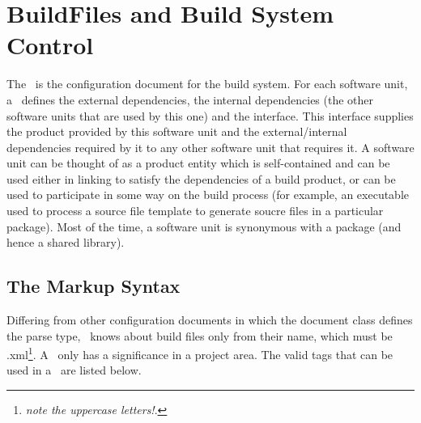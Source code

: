 \section{BuildFiles and Build System Control}

The \buildfile\ is the configuration document for the build system. For
each software unit, a \buildfile\ defines the external dependencies, the
internal dependencies (\ie the other software units that are used by
this one) and the interface. This interface supplies the product
provided by this software unit and the external/internal dependencies
required by it to any other software unit that requires it.
A software unit can be thought of as a product entity which is self-contained
and can be used either in linking to satisfy the dependencies of
a build product, or can be used to participate in some way on the
build process (for example, an executable used to process a source
file template to generate soucre files in a particular package).
Most of the time, a software unit is synonymous with a package (and
hence a shared library). 

\subsection{The Markup Syntax}
\index{\buildfile}

Differing from other configuration documents in which the document
class defines the parse type, \scram\ knows about build files only 
from their name, which must be \buildfile.xml\footnote{\textit{note the uppercase letters!}.}.
A \buildfile\ only has a significance in a project area. The 
valid tags that can be used in a \buildfile\ are listed below.

